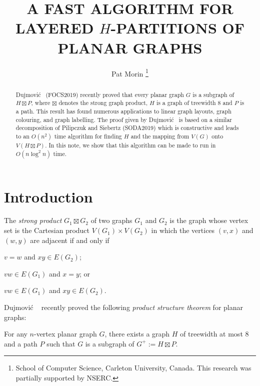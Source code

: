 \documentclass[kpfonts]{patmorin}
\title{\MakeUppercase{A Fast Algorithm for Layered $H$-Partitions of Planar Graphs}}
\author{
  Pat Morin%
    \thanks{School of Computer Science, Carleton University, Canada. This research was partially supported by NSERC.}
}
\begin{document}
\maketitle

\begin{abstract}
  Dujmović \etal\  (FOCS2019) recently proved that every planar graph $G$ is a subgraph of $H\boxtimes P$, where $\boxtimes$ denotes the strong graph product, $H$ is a graph of treewidth 8 and $P$ is a path.  This result has found numerous applications to linear graph layouts, graph colouring, and graph labelling.  The proof given by Dujmović \etal\  is based on a similar decomposition of Pilipczuk and Siebertz (SODA2019) which is constructive and leads to an $O(n^2)$ time algorithm for finding $H$ and the mapping from $V(G)$ onto $V(H\boxtimes P)$.  In this note, we show that this algorithm can be made to run in $O(n\log^2 n)$ time.
\end{abstract}

\section{Introduction}

The \emph{strong product} $G_1\boxtimes G_2$ of two graphs $G_1$ and $G_2$ is the graph whose vertex set is the Cartesian product $V(G_1)\times V(G_2)$ in which the vertices $(v,x)$ and $(w,y)$ are adjacent if and only if
\begin{compactitem}
  \item $v=w$ and $xy\in E(G_2)$;
  \item $vw\in E(G_1)$ and $x=y$; or
  \item $vw\in E(G_1)$ and $xy\in E(G_2)$.
\end{compactitem}
Dujmović \etal\  \cite{dujmovic.joret.ea:planar} recently proved the following \emph{product structure theorem} for planar graphs:

\begin{thm}
  For any $n$-vertex planar graph $G$, there exists a graph $H$ of treewidth at most 8 and a path $P$ such that $G$ is a subgraph of $G^+:=H\boxtimes P$.
\end{thm}
\end{document}
